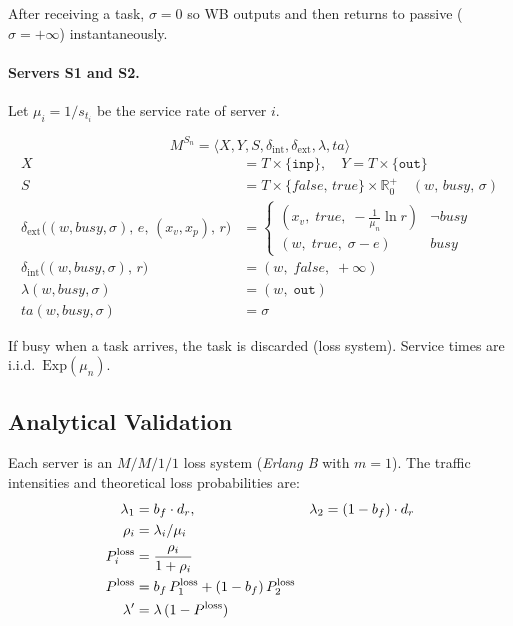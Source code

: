 After receiving a task, $\sigma = 0$ so WB outputs and then returns to
passive ($\sigma = +\infty$) instantaneously.

\paragraph{Servers S1 and S2.}

Let $\mu_i = 1/s_{t_i}$ be the service rate of server $i$.

\[
  M^{S_n} = \langle X, Y, S, \delta_{\mathrm{int}}, \delta_{\mathrm{ext}},
                \lambda, ta \rangle
\]
\begin{align*}
  X &= T \times \{\texttt{inp}\}, \quad Y = T \times \{\texttt{out}\} \\
  S &= T \times \{false,\,true\} \times \mathbb{R}^+_0
       \quad (w,\,\mathit{busy},\,\sigma) \\
  \delta_{\mathrm{ext}}\!\bigl((w,\mathit{busy},\sigma),\,e,\,(x_v,x_p),\,r\bigr)
    &= \begin{cases}
         (x_v,\;true,\;-\tfrac{1}{\mu_n}\ln r) & \neg\mathit{busy} \\
         (w,\;true,\;\sigma - e)                & \mathit{busy}
       \end{cases} \\
  \delta_{\mathrm{int}}\!\bigl((w,\mathit{busy},\sigma),\,r\bigr)
    &= (w,\;false,\;+\infty) \\
  \lambda(w,\mathit{busy},\sigma) &= (w,\;\texttt{out}) \\
  ta(w,\mathit{busy},\sigma) &= \sigma
\end{align*}

If busy when a task arrives, the task is discarded (loss system).
Service times are i.i.d.\ $\mathrm{Exp}(\mu_n)$.

\subsection*{Analytical Validation}

Each server is an $M/M/1/1$ loss system (\textit{Erlang B} with $m = 1$).
The traffic intensities and theoretical loss probabilities are:
\begin{align}
  \lambda_1 &= b_f \cdot d_r, & \lambda_2 &= (1 - b_f)\cdot d_r \notag \\
  \rho_i    &= \lambda_i / \mu_i \notag \\
  P^{\mathrm{loss}}_i &= \frac{\rho_i}{1 + \rho_i}
    \label{eq:erlang-b} \\
  P^{\mathrm{loss}} &= b_f\, P^{\mathrm{loss}}_1 + (1 - b_f)\,P^{\mathrm{loss}}_2
    \label{eq:total-loss} \\
  \lambda' &= \lambda\,(1 - P^{\mathrm{loss}})
    \label{eq:throughput}
\end{align}

